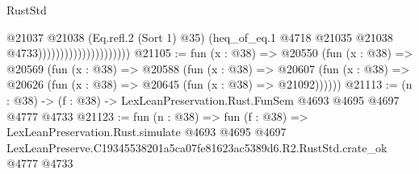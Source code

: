 \begin{lexlean}{RustStd}
\begin{coremodule}
                                          @21037
                                            @21038
                                            (Eq.refl.{2} (Sort 1) @35)
                                            (heq_of_eq.{1}
                                              @4718
                                              @21035
                                              @21038
                                              @4733)))))))))))))))))))))
@21105 := fun (x : @38) =>
  @20550
    (fun (x : @38) =>
    @20569
      (fun (x : @38) =>
      @20588
        (fun (x : @38) =>
        @20607 (fun (x : @38) => @20626 (fun (x : @38) => @20645 (fun (x : @38) => @21092))))))
@21113 := (n : @38) -> (f : @38) -> LexLeanPreservation.Rust.FunSem @4693 @4695 @4697 @4777 @4733
@21123 := fun (n : @38) =>
  fun (f : @38) =>
  LexLeanPreservation.Rust.simulate
    @4693
    @4695
    @4697
    LexLeanPreserve.C19345538201a5ca07fe81623ac5389d6.R2.RustStd.crate_ok
    @4777
    @4733
\end{coremodule}
\end{lexlean}
